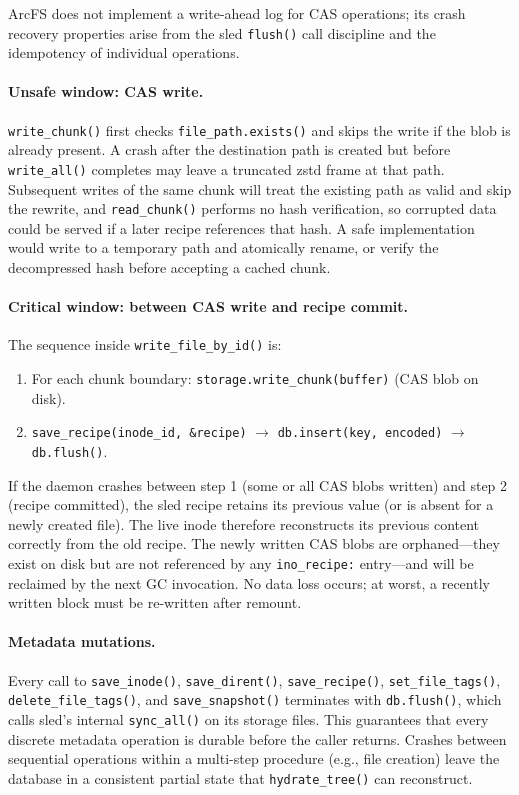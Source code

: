 \documentclass[journal]{IEEEtran}
\begin{document}
ArcFS does not implement a write-ahead log for CAS operations; its crash
recovery properties arise from the sled \texttt{flush()} call discipline
and the idempotency of individual operations.

\paragraph{Unsafe window: CAS write.}
\texttt{write\_chunk()} first checks \texttt{file\_path.exists()} and
skips the write if the blob is already present.  A crash after the
destination path is created but before \texttt{write\_all()} completes
may leave a truncated zstd frame at that path.  Subsequent writes of the
same chunk will treat the existing path as valid and skip the rewrite,
and \texttt{read\_chunk()} performs no hash verification, so corrupted
data could be served if a later recipe references that hash.  A safe
implementation would write to a temporary path and atomically rename, or
verify the decompressed hash before accepting a cached chunk.

\paragraph{Critical window: between CAS write and recipe commit.}
The sequence inside \texttt{write\_file\_by\_id()} is:
\begin{enumerate}
\item For each chunk boundary: \texttt{storage.write\_chunk(buffer)}
  (CAS blob on disk).
\item \texttt{save\_recipe(inode\_id, \&recipe)} $\to$
  \texttt{db.insert(key, encoded)} $\to$ \texttt{db.flush()}.
\end{enumerate}
If the daemon crashes between step 1 (some or all CAS blobs written)
and step 2 (recipe committed), the sled recipe retains its previous
value (or is absent for a newly created file).  The live inode
therefore reconstructs its previous content correctly from the old
recipe.  The newly written CAS blobs are orphaned—they exist on disk but
are not referenced by any \texttt{ino\_recipe:} entry—and will be
reclaimed by the next GC invocation.  No data loss occurs; at worst,
a recently written block must be re-written after remount.

\paragraph{Metadata mutations.}
Every call to \texttt{save\_inode()}, \texttt{save\_dirent()},
\texttt{save\_recipe()}, \texttt{set\_file\_tags()},
\texttt{delete\_file\_tags()}, and \texttt{save\_snapshot()} terminates
with \texttt{db.flush()}, which calls sled's internal \texttt{sync\_all()}
on its storage files.  This guarantees that every discrete metadata
operation is durable before the caller returns.  Crashes between
sequential operations within a multi-step procedure (e.g., file
creation) leave the database in a consistent partial state that
\texttt{hydrate\_tree()} can reconstruct.
\end{document}
